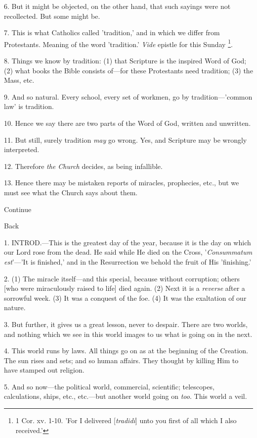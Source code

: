 6. But it might be objected, on the other hand,
that such sayings were not recollected. But some might be.

7. This is what Catholics called 'tradition,' and
in which we differ from Protestants. Meaning of the word 'tradition.' \emph{Vide}
epistle for this Sunday \footnote{1 Cor. xv. 1-10. 'For I
delivered [\emph{tradidi}] unto you first of all which I also
received.'}.

8. Things we know by tradition: (1) that
Scripture is the inspired Word of God; (2) what books the Bible
consists of—for these Protestants need tradition; (3) the Mass, etc.

9. And so natural. Every school, every set of
workmen, go by tradition—'common law' is tradition.

10. Hence we say there are two parts of the Word
of God, written and unwritten.

11. But still, surely tradition \emph{may} go
wrong. Yes, and Scripture may be wrongly interpreted.

12. Therefore \emph{the Church} decides, as being
infallible.

13. Hence there may be mistaken reports of
miracles, prophecies, etc., but we must see what the Church says about
them.

Continue

Back


1. INTROD.—This
is the greatest day of the year, because it is the day on which our
Lord rose from the dead. He said while He died on the Cross, '\emph{Consummatum
est}'—'It is finished,' and in the Resurrection we behold the
fruit of His 'finishing.'

2. (1) The miracle itself—and this special,
because without corruption; others [who were miraculously raised to
life] died again. (2) Next it is a \emph{reverse} after a sorrowful
week. (3) It was a conquest of the foe. (4) It was the exaltation of
our nature.

3. But further, it gives us a great lesson, never
to despair. There are two worlds, and nothing which we see in this
world images to us what is going on in the next.

4. This world runs by laws. All things go on as
at the beginning of the Creation. The sun rises and sets; and so human
affairs. They thought by killing Him to have stamped out religion.

5. And so now—the political world, commercial,
scientific; telescopes, calculations, ships, etc., etc.—but another
world going on \emph{too}. This world a veil.


